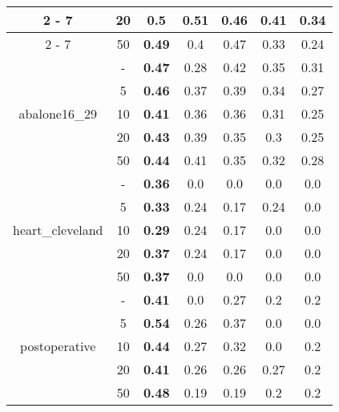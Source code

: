 \documentclass{article}%
\begin{document}
\begin{longtable}{c|c|ccccc}
\cline{2%
-%
7}%
&20&0.5&\textbf{0.51}&0.46&0.41&0.34\\%
\cline{2%
-%
7}%
&50&\textbf{0.49}&0.4&0.47&0.33&0.24\\%
\hline%
\multirow{5}{*}{abalone16\_29}&{-}&\textbf{0.47}&0.28&0.42&0.35&0.31\\%
\cline{2%
-%
7}%
&5&\textbf{0.46}&0.37&0.39&0.34&0.27\\%
\cline{2%
-%
7}%
&10&\textbf{0.41}&0.36&0.36&0.31&0.25\\%
\cline{2%
-%
7}%
&20&\textbf{0.43}&0.39&0.35&0.3&0.25\\%
\cline{2%
-%
7}%
&50&\textbf{0.44}&0.41&0.35&0.32&0.28\\%
\hline%
\multirow{5}{*}{heart\_cleveland}&{-}&\textbf{0.36}&0.0&0.0&0.0&0.0\\%
\cline{2%
-%
7}%
&5&\textbf{0.33}&0.24&0.17&0.24&0.0\\%
\cline{2%
-%
7}%
&10&\textbf{0.29}&0.24&0.17&0.0&0.0\\%
\cline{2%
-%
7}%
&20&\textbf{0.37}&0.24&0.17&0.0&0.0\\%
\cline{2%
-%
7}%
&50&\textbf{0.37}&0.0&0.0&0.0&0.0\\%
\hline%
\multirow{5}{*}{postoperative}&{-}&\textbf{0.41}&0.0&0.27&0.2&0.2\\%
\cline{2%
-%
7}%
&5&\textbf{0.54}&0.26&0.37&0.0&0.0\\%
\cline{2%
-%
7}%
&10&\textbf{0.44}&0.27&0.32&0.0&0.2\\%
\cline{2%
-%
7}%
&20&\textbf{0.41}&0.26&0.26&0.27&0.2\\%
\cline{2%
-%
7}%
&50&\textbf{0.48}&0.19&0.19&0.2&0.2\\%
\hline%
\end{longtable}

%
\end{document}
